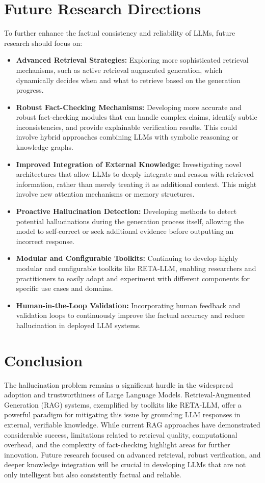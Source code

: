 \documentclass{article}
\begin{document}
\section{Future Research Directions}
To further enhance the factual consistency and reliability of LLMs, future research should focus on:
\begin{itemize}
    \item \textbf{Advanced Retrieval Strategies:} Exploring more sophisticated retrieval mechanisms, such as active retrieval augmented generation, which dynamically decides when and what to retrieve based on the generation progress.
    \item \textbf{Robust Fact-Checking Mechanisms:} Developing more accurate and robust fact-checking modules that can handle complex claims, identify subtle inconsistencies, and provide explainable verification results. This could involve hybrid approaches combining LLMs with symbolic reasoning or knowledge graphs.
    \item \textbf{Improved Integration of External Knowledge:} Investigating novel architectures that allow LLMs to deeply integrate and reason with retrieved information, rather than merely treating it as additional context. This might involve new attention mechanisms or memory structures.
    \item \textbf{Proactive Hallucination Detection:} Developing methods to detect potential hallucinations during the generation process itself, allowing the model to self-correct or seek additional evidence before outputting an incorrect response.
    \item \textbf{Modular and Configurable Toolkits:} Continuing to develop highly modular and configurable toolkits like RETA-LLM, enabling researchers and practitioners to easily adapt and experiment with different components for specific use cases and domains.
    \item \textbf{Human-in-the-Loop Validation:} Incorporating human feedback and validation loops to continuously improve the factual accuracy and reduce hallucination in deployed LLM systems.
\end{itemize}

\section{Conclusion}
The hallucination problem remains a significant hurdle in the widespread adoption and trustworthiness of Large Language Models. Retrieval-Augmented Generation (RAG) systems, exemplified by toolkits like RETA-LLM, offer a powerful paradigm for mitigating this issue by grounding LLM responses in external, verifiable knowledge. While current RAG approaches have demonstrated considerable success, limitations related to retrieval quality, computational overhead, and the complexity of fact-checking highlight areas for further innovation. Future research focused on advanced retrieval, robust verification, and deeper knowledge integration will be crucial in developing LLMs that are not only intelligent but also consistently factual and reliable.
\end{document}

